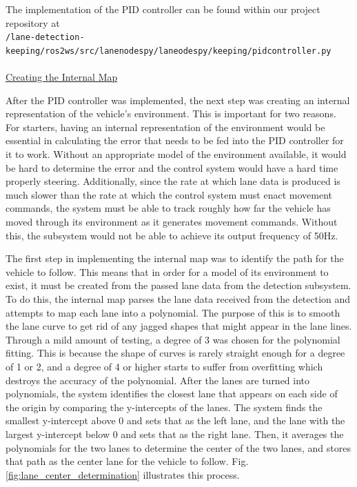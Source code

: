 \documentclass[titlepage,draft]{article}
\begin{document}
{The implementation of the PID controller can be found within our project
repository at \\\texttt{/lane-detection-keeping/ros2\textunderscore ws/src/lane\textunderscore nodes\textunderscore py/lane\textunderscore odes\textunderscore py/keeping/pid\textunderscore controller.py}\\~\\
\underline{Creating the Internal Map}

After the PID controller was implemented, the next step was creating an internal representation of the vehicle's environment. This is important for two reasons. For starters, having an internal representation of the environment would be essential in calculating the error that needs to be fed into the PID controller for it to work. Without an appropriate model of the environment available, it would be hard to determine the error and the control system would have a hard time properly steering. Additionally, since the rate at which lane data is produced is much slower than the rate at which the control system must enact movement commands, the system must be able to track roughly how far the vehicle has moved through its environment as it generates movement commands. Without this, the subsystem would not be able to achieve its output frequency of 50Hz.

The first step in implementing the internal map was to identify the path for the vehicle to follow. This means that in order for a model of its environment to exist, it must be created from the passed lane data from the detection subsystem. To do this, the internal map parses the lane data received from the detection and attempts to map each lane into a polynomial. The purpose of this is to smooth the lane curve to get rid of any jagged shapes that might appear in the lane lines. Through a mild amount of testing, a degree of 3 was chosen for the polynomial fitting. This is because the shape of curves is rarely straight enough for a degree of 1 or 2, and a degree of 4 or higher starts to suffer from overfitting which destroys the accuracy of the polynomial. After the lanes are turned into polynomials, the system identifies the closest lane that appears on each side of the origin by comparing the y-intercepts of the lanes. The system finds the smallest y-intercept above 0 and sets that as the left lane, and the lane with the largest y-intercept below 0 and sets that as the right lane. Then, it averages the polynomials for the two lanes to determine the center of the two lanes, and stores that path as the center lane for the vehicle to follow. Fig. \ref{fig:lane_center_determination} illustrates this process.

}
\end{document}
